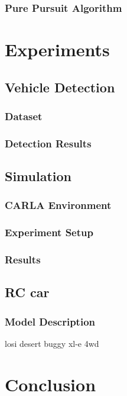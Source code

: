 \subsection{Pure Pursuit Algorithm}

\chapter{Experiments}

\section{Vehicle Detection}
\subsection{Dataset}
\subsection{Detection Results}

\section{Simulation}
\subsection{CARLA Environment}
\subsection{Experiment Setup}
\subsection{Results}

\section{RC car}
\subsection{Model Description}
losi desert buggy xl-e 4wd




\chapter{Conclusion}






